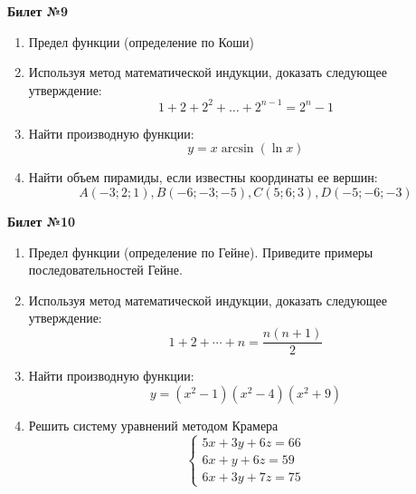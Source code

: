 \documentclass[a4paper, 12pt]{article}
\begin{document}
\begin{center}
    \textbf{Билет №9}
\end{center}
\begin{enumerate}
\item Предел функции (определение по Коши)
\item Используя метод математической индукции, доказать следующее утверждение:
\[1 + 2 + 2^2 + \dots + 2^{n-1} = 2^n - 1\]
\item Найти производную функции: 
\[y = x \arcsin(\ln x)\]
\item Найти объем пирамиды, если известны координаты ее вершин:
\[A(-3;2;1), B(-6;-3;-5), C(5;6;3), D(-5;-6;-3)\]
\end{enumerate}

\begin{center}
    \textbf{Билет №10}
\end{center}
\begin{enumerate}
\item Предел функции (определение по Гейне). Приведите примеры последовательностей Гейне.
\item Используя метод математической индукции, доказать следующее утверждение:
\[1 + 2 + \cdots + n = \frac{n(n+1)}{2}\]
\item Найти производную функции: 
\[y =  (x^2 - 1)(x^2 - 4)(x^2 + 9)\]
\item Решить систему уравнений методом Крамера
\[
	\begin{cases}
		5x + 3y + 6z = 66 \\
		6x + y + 6z = 59 \\
		6x + 3y + 7z = 75
	\end{cases}
\]
\end{enumerate}
\end{document}
